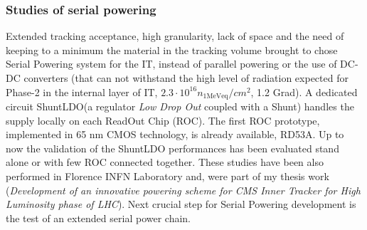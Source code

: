 \documentclass[a4paper,12pt,italian]{article}
\begin{document}
\subsubsection*{Studies of serial powering}
Extended tracking acceptance, high granularity, lack of space and the need of keeping to a minimum the material in the tracking volume brought to chose Serial Powering system for the IT, instead of parallel powering or the use of DC-DC converters (that can not withstand the high level of radiation expected for Phase-2 in the internal layer of IT, $2.3 \cdot 10^16 n_{\mathrm{1 MeV eq}}/cm^2$, 1.2 Grad). A dedicated circuit ShuntLDO\cite{SLDO}(a regulator \textit{Low Drop Out} coupled with a Shunt) handles the supply locally on each ReadOut Chip (ROC). The first ROC prototype, implemented in 65 nm CMOS technology, is already available, RD53A\cite{RD53A}. 
Up to now the validation of the ShuntLDO performances has been evaluated stand alone or with few ROC connected together. 
These studies have been also performed in Florence INFN Laboratory and, were part of my thesis work (\textit{Development of an innovative powering scheme for CMS Inner Tracker for High Luminosity phase of LHC}). Next crucial step for Serial Powering development is the test of an extended serial power chain. %
\end{document}
